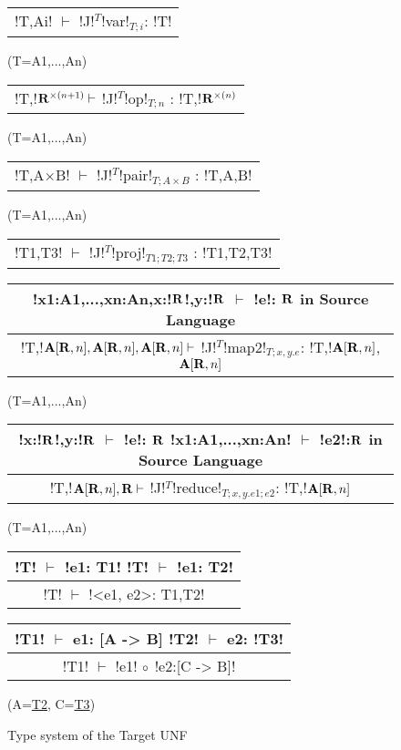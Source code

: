 \begin{figure*}[tb]
    \centering
    \begin{tabular}{c} 
        \\\hline
        !T,Ai! $\vdash$ !J!$^T$!var!$_{T;i}$: !T!
        \end{tabular}(T=A1,...,An)
        \hspace{0.5cm}
        \begin{tabular}{c}
            \\\hline
            !T,!$\mathbf{R}^{\times(n+1)} \vdash$ !J!$^T$!op!$_{T;n}$ : !T,!$\mathbf{R}^{\times(n)}$
        \end{tabular}(T=A1,...,An)
    
        \begin{tabular}{c}
            \\\hline
            !T,A$\times$B! $\vdash$ !J!$^T$!pair!$_{T;A\times B}$ : !T,A,B!
        \end{tabular}(T=A1,...,An)
    
        \begin{tabular}{c}
            \\\hline
            !T1,T3! $\vdash$ !J!$^T$!proj!$_{T1;T2;T3}$ : !T1,T2,T3!
        \end{tabular}
    
        \begin{tabular}{c}
            !x1:A1,...,xn:An,x:!$\mathbf{R}$!,y:!$\mathbf{R}$ $\vdash$ !e!: $\mathbf{R}$ \quad in Source Language
            \\\hline  
            !T,!$\mathbf{A}[\mathbf{R},n],\mathbf{A}[\mathbf{R},n],\mathbf{A}[\mathbf{R},n] \vdash$ !J!$^T$!map2!$_{T; x,y.e}$: !T,!$\mathbf{A}[\mathbf{R},n]$,$\mathbf{A}[\mathbf{R},n]$
        \end{tabular}(T=A1,...,An)
    
        \begin{tabular}{c}
            !x:!$\mathbf{R}$!,y:!$\mathbf{R}$ $\vdash$ !e!: $\mathbf{R}$ \quad !x1:A1,...,xn:An! $\vdash$ !e2!:$\mathbf{R}$ \quad in Source Language
            \\\hline  
            !T,!$\mathbf{A}[\mathbf{R},n],\mathbf{R} \vdash$ !J!$^T$!reduce!$_{T; x,y.e1; e2}$: !T,!$\mathbf{A}[\mathbf{R},n]$
        \end{tabular}(T=A1,...,An)

        \begin{tabular}{c}
            !T! $\vdash$ !e1: T1!  \quad !T! $\vdash$ !e1: T2!
            \\ \hline
            !T! $\vdash$ !<e1, e2>: T1,T2!
        \end{tabular}

        \begin{tabular}{c}
            !T1! $\vdash$ e1: [A -> B]  \quad !T2! $\vdash$ e2: !T3! 
            \\ \hline
            !T1! $\vdash$ !e1! $\circ$ !e2:[C -> B]!
        \end{tabular}(A=\underline{T2}, C=\underline{T3})

    \vspace{-0.2cm}
    \caption{Type system of the Target UNF}
    \vspace{-0.4cm}
    \label{fig:target_unf_typesystem}
    \end{figure*}